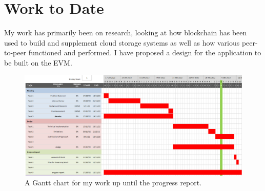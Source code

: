 \section{Work to Date}

My work has primarily been on research, looking at how blockchain has been used to build and supplement cloud storage systems as well as how various peer-to-peer functioned and performed. 
I have proposed a design for the application to be built on the EVM. 

\begin{figure}[ht]
  \includegraphics[width=\textwidth]{assets/images/charts/gantt/progress.png}
  \caption{A Gantt chart for my work up until the progress report.}
\end{figure}
